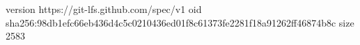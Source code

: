 version https://git-lfs.github.com/spec/v1
oid sha256:98db1efc66eb436d4c5c0210436ed01f8c61373fe2281f18a91262ff46874b8c
size 2583
